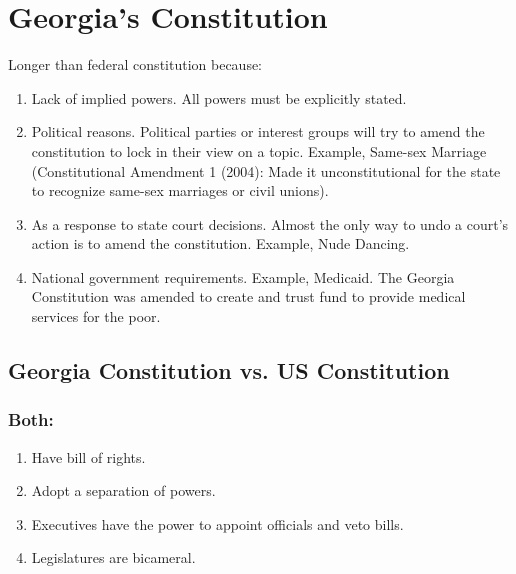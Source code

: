 \section{Georgia's Constitution}
Longer than federal constitution because:
\begin{enumerate}
    \item Lack of implied powers. All powers must be explicitly stated.
    \item Political reasons. Political parties or interest groups will try to amend the constitution to lock in their view on a topic. Example, Same-sex Marriage (Constitutional Amendment 1 (2004): Made it unconstitutional for the state to recognize same-sex marriages or civil unions).
    \item As a response to state court decisions. Almost the only way to undo a court's action is to amend the constitution. Example, Nude Dancing.
    \item National government requirements. Example, Medicaid. The Georgia Constitution was amended to create and trust fund to provide medical services for the poor.
\end{enumerate}
\subsection{Georgia Constitution vs. US Constitution}
\subsubsection{Both:}
\begin{enumerate}
    \item Have bill of rights.
    \item Adopt a separation of powers.
    \item Executives have the power to appoint officials and veto bills.
    \item Legislatures are bicameral.
\end{enumerate}
